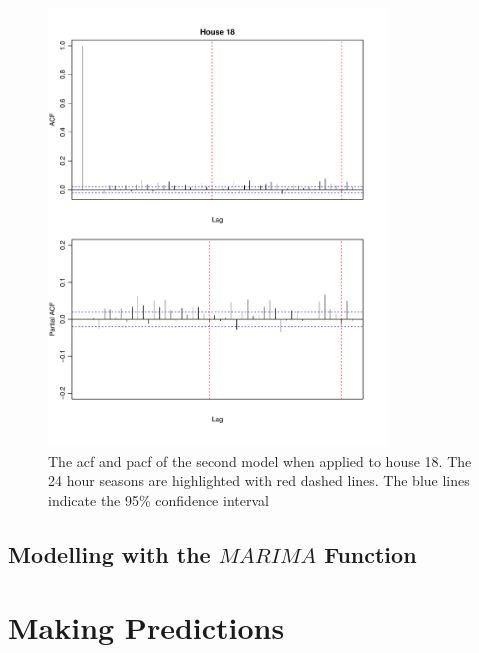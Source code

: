 \begin{figure}
    \centering
    \includegraphics[width=0.8\textwidth]{../../../figures/arimax/ACF_18_short.pdf}
    \caption{The acf and pacf of the second model when applied to house 18. The 24 hour seasons are highlighted with red dashed lines. The blue lines indicate the 95\% confidence interval}
    \label{fig:Model2_acf_18}
\end{figure}    







\subsection{Modelling with the $MARIMA$ Function}




\section{Making Predictions}

